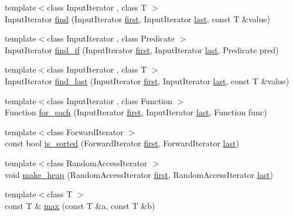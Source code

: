 \begin{DoxyCompactItemize}
\item 
{\footnotesize template$<$class Input\+Iterator , class T $>$ }\\Input\+Iterator \hyperlink{namespaceprism_a1b543d9c2862a539cc8b770abda87561}{find} (Input\+Iterator \hyperlink{namespaceprism_ae3fb7a1926a9e8e59300cd5e370470da}{first}, Input\+Iterator \hyperlink{namespaceprism_abe4956c4e865f55ca126b7fb973b5078}{last}, const T \&value)
\item 
{\footnotesize template$<$class Input\+Iterator , class Predicate $>$ }\\Input\+Iterator \hyperlink{namespaceprism_aa17e9e6c80f8a52479a52450a108a636}{find\+\_\+if} (Input\+Iterator \hyperlink{namespaceprism_ae3fb7a1926a9e8e59300cd5e370470da}{first}, Input\+Iterator \hyperlink{namespaceprism_abe4956c4e865f55ca126b7fb973b5078}{last}, Predicate pred)
\item 
{\footnotesize template$<$class Input\+Iterator , class T $>$ }\\Input\+Iterator \hyperlink{namespaceprism_a3189014b9fa31e0ef0d1933c6f616618}{find\+\_\+last} (Input\+Iterator \hyperlink{namespaceprism_ae3fb7a1926a9e8e59300cd5e370470da}{first}, Input\+Iterator \hyperlink{namespaceprism_abe4956c4e865f55ca126b7fb973b5078}{last}, const T \&value)
\item 
{\footnotesize template$<$class Input\+Iterator , class Function $>$ }\\Function \hyperlink{namespaceprism_aae062d5bfdc0e53ae49c56520aded906}{for\+\_\+each} (Input\+Iterator \hyperlink{namespaceprism_ae3fb7a1926a9e8e59300cd5e370470da}{first}, Input\+Iterator \hyperlink{namespaceprism_abe4956c4e865f55ca126b7fb973b5078}{last}, Function func)
\item 
{\footnotesize template$<$class Forward\+Iterator $>$ }\\const bool \hyperlink{namespaceprism_acf5efbeb096446c47690b9e8bd2cc01a}{is\+\_\+sorted} (Forward\+Iterator \hyperlink{namespaceprism_ae3fb7a1926a9e8e59300cd5e370470da}{first}, Forward\+Iterator \hyperlink{namespaceprism_abe4956c4e865f55ca126b7fb973b5078}{last})
\item 
{\footnotesize template$<$class Random\+Access\+Iterator $>$ }\\void \hyperlink{namespaceprism_af8e36230e6cb92a41aaca282772a9e6e}{make\+\_\+heap} (Random\+Access\+Iterator \hyperlink{namespaceprism_ae3fb7a1926a9e8e59300cd5e370470da}{first}, Random\+Access\+Iterator \hyperlink{namespaceprism_abe4956c4e865f55ca126b7fb973b5078}{last})
\item 
{\footnotesize template$<$class T $>$ }\\const T \& \hyperlink{namespaceprism_a812456273adfa37979e79f07e731d412}{max} (const T \&a, const T \&b)

\end{DoxyCompactItemize}
